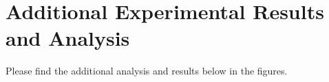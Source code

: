 \appendix

\section{Additional Experimental Results and Analysis}
\label{app:expts}

Please find the additional analysis and results below in the figures.


    
    

    

